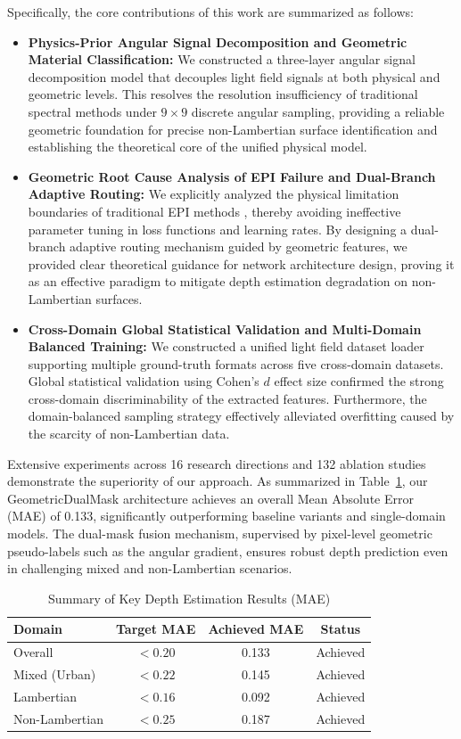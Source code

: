 \documentclass[lettersize,journal]{IEEEtran}
\begin{document}
Specifically, the core contributions of this work are summarized as follows:
\begin{itemize}
    \item \textbf{Physics-Prior Angular Signal Decomposition and Geometric Material Classification:} We constructed a three-layer angular signal decomposition model that decouples light field signals at both physical and geometric levels. This resolves the resolution insufficiency of traditional spectral methods under $9 \times 9$ discrete angular sampling, providing a reliable geometric foundation for precise non-Lambertian surface identification and establishing the theoretical core of the unified physical model.
    \item \textbf{Geometric Root Cause Analysis of EPI Failure and Dual-Branch Adaptive Routing:} We explicitly analyzed the physical limitation boundaries of traditional EPI methods \cite{epinet2018baseline}, thereby avoiding ineffective parameter tuning in loss functions and learning rates. By designing a dual-branch adaptive routing mechanism guided by geometric features, we provided clear theoretical guidance for network architecture design, proving it as an effective paradigm to mitigate depth estimation degradation on non-Lambertian surfaces.
    \item \textbf{Cross-Domain Global Statistical Validation and Multi-Domain Balanced Training:} We constructed a unified light field dataset loader supporting multiple ground-truth formats across five cross-domain datasets. Global statistical validation using Cohen's $d$ effect size confirmed the strong cross-domain discriminability of the extracted features. Furthermore, the domain-balanced sampling strategy effectively alleviated overfitting caused by the scarcity of non-Lambertian data.
\end{itemize}

Extensive experiments across 16 research directions and 132 ablation studies demonstrate the superiority of our approach. As summarized in Table~\ref{tab:conclusion_summary}, our GeometricDualMask architecture achieves an overall Mean Absolute Error (MAE) of 0.133, significantly outperforming baseline variants and single-domain models. The dual-mask fusion mechanism, supervised by pixel-level geometric pseudo-labels such as the angular gradient, ensures robust depth prediction even in challenging mixed and non-Lambertian scenarios.

\begin{table}[!t]
\centering
\caption{Summary of Key Depth Estimation Results (MAE)}
\label{tab:conclusion_summary}
\begin{tabular}{@{}lccc@{}}
\toprule
\textbf{Domain} & \textbf{Target MAE} & \textbf{Achieved MAE} & \textbf{Status} \\
\midrule
Overall & $< 0.20$ & 0.133 & Achieved \\
Mixed (Urban) & $< 0.22$ & 0.145 & Achieved \\
Lambertian & $< 0.16$ & 0.092 & Achieved \\
Non-Lambertian & $< 0.25$ & 0.187 & Achieved \\
\bottomrule
\end{tabular}
\end{table}
\end{document}
